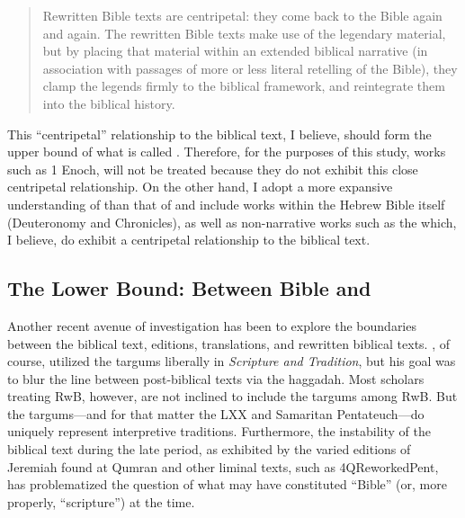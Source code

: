  \begin{quote} Rewritten Bible texts are centripetal: they come back to the Bible again and again. The rewritten Bible texts make use of the legendary material, but by placing that material within an extended biblical narrative (in association with passages of more or less literal retelling of the Bible), they clamp the legends firmly to the biblical framework, and reintegrate them into the biblical history. \autocite[117]{alexander_carson-williamson1988} \end{quote} 

 This ``centripetal'' relationship to the biblical text, I believe, should form the upper bound of what is called \rwb. Therefore, for the purposes of this study, works such as 1 Enoch, will not be treated because they do not exhibit this close centripetal relationship. On the other hand, I adopt a more expansive understanding of \rwb than that of \vermes and include works within the Hebrew Bible itself (Deuteronomy and Chronicles), as well as non-narrative works such as the \templescroll which, I believe, do exhibit a centripetal relationship to the biblical text. 

 \hypertarget{the-lower-bound-between-bible-and-rwb}{%
\subsection{The Lower Bound: Between Bible and \RWB}\label{the-lower-bound-between-bible-and-rwb}} 

 Another recent avenue of investigation has been to explore the boundaries between the biblical text, editions, translations, and rewritten biblical texts. \vermes, of course, utilized the targums liberally in \emph{Scripture and Tradition}, but his goal was to blur the line between post-biblical texts via the haggadah. Most scholars treating RwB, however, are not inclined to include the targums among RwB. But the targums---and for that matter the LXX and Samaritan Pentateuch---do uniquely represent interpretive traditions. Furthermore, the instability of the biblical text during the late \secondtemple period, as exhibited by the varied editions of Jeremiah found at Qumran and other liminal texts, such as 4QReworkedPent, has problematized the question of what may have constituted ``Bible'' (or, more properly, ``scripture'') at the time. 


